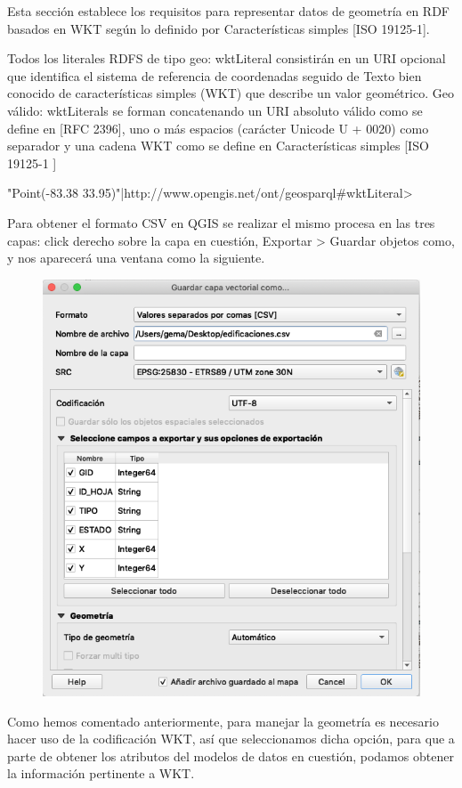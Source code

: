 Esta sección establece los requisitos para representar datos de geometría en RDF basados en WKT según lo definido por Características simples [ISO 19125-1].

Todos los literales RDFS de tipo geo: wktLiteral consistirán en un URI opcional que identifica el sistema de referencia de coordenadas seguido de Texto bien conocido de características simples (WKT) que describe un valor geométrico. Geo válido: wktLiterals se forman concatenando un URI absoluto válido como se define en [RFC 2396], uno o más espacios (carácter Unicode U + 0020) como separador y una cadena WKT como se define en Características simples [ISO 19125-1 ]

\begin{listing}
	"Point(-83.38 33.95)"^^<http://www.opengis.net/ont/geosparql#wktLiteral>
\end{listing}

Para obtener el formato CSV en QGIS se realizar el mismo procesa en las tres capas: click derecho sobre la capa en cuestión, Exportar > Guardar objetos como, y nos aparecerá una ventana como la siguiente.

\begin{figure}[H]
	\centering
	\includegraphics[width=0.7\linewidth]{imagenes/capitulo4/csv}
	\caption{}
	\label{fig:csv}
\end{figure}

Como hemos comentado anteriormente, para manejar la geometría es necesario hacer uso de la codificación WKT, así que seleccionamos dicha opción, para que a parte de obtener los atributos del modelos de datos en cuestión, podamos obtener la información pertinente a WKT.

